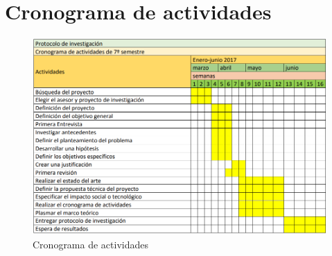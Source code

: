 \chapter{Cronograma de actividades}
\begin{figure}[h]
  \centering
  \includegraphics[scale=.7]{lib/assets/cronograma-1}
  \caption{Cronograma de actividades}
\end{figure}
